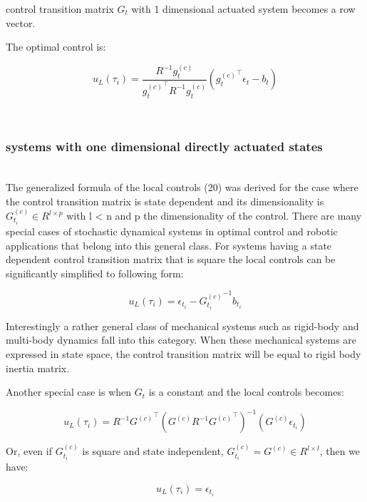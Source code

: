 \documentclass[journal]{IEEEtran}
\begin{document}
control transition matrix $G_t$ with 1 dimensional actuated system becomes a row vector. 

The optimal control is:

\begin{equation}
  u_L(\tau_i) = \frac{R^{-1}{g_t^{(c)}}}{{g_t^{(c)}}^{\top}R^{-1}g_t^{(c)}} ({g_t^{(c)}}^{\top}\epsilon_t - b_t)
\end{equation}

\ \\
\subsubsection{systems with one dimensional directly actuated states}
\ \\

The generalized formula of the local controls (20) was derived for the case where the control transition matrix is state dependent and its dimensionality is $G_{t_i}^{(c)} \in R^{l\times p}$  with l < n and p the dimensionality 
of the control. There are many special cases of stochastic dynamical systems in optimal control and robotic applications that belong into this general class. For systems having a state
dependent control transition matrix that is square the local controls can be significantly simplified to following form:

\begin{equation}
  u_L(\tau_i) = \epsilon_{t_i} - {G_{t_i}^{(c)}}^{-1} b_{t_i}
  \label{21}
\end{equation}

Interestingly a rather general class of mechanical systems such as rigid-body and multi-body dynamics fall into this category. When these mechanical systems are expressed in state space, the control transition matrix 
will be equal to rigid body inertia matrix.

Another special case is when $G_t$ is a constant and the local controls becomes:

\begin{equation}
  u_L(\tau_i) = R^{-1} {G^{(c)}}^{\top} ({G^{(c)}} R^{-1} {G^{(c)}}^{\top})^{-1}(G^{(c)}\epsilon_{t_i})
  \label{22}
\end{equation}

Or, even if $G_{t_i}^{(c)}$ is square and state independent, $G_{t_i}^{(c)} = G^{(c)} \in R^{l \times l}$, then we have:

\begin{equation}
  u_L(\tau_i) = \epsilon_{t_i} 
  \label{23}
\end{equation}
\end{document}
